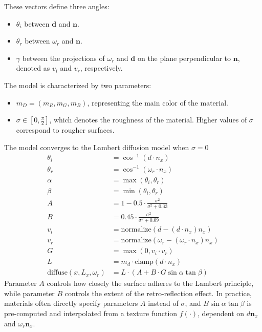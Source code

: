 These vectors define three angles:
\begin{itemize}
    \item $\theta_i$ between $\mathbf{d}$ and $\mathbf{n}$.
    \item $\theta_r$ between $\omega_r$ and $\mathbf{n}$.
    \item $\gamma$ between the projections of $\omega_r$ and $\mathbf{d}$ on the plane perpendicular to $\mathbf{n}$, denoted as $v_i$ and $v_r$, respectively.
\end{itemize}
The model is characterized by two parameters:
\begin{itemize}
    \item $m_D = (m_R, m_G, m_B)$, representing the main color of the material. 
    \item $\sigma\in\left[0,\frac{\pi}{2}\right]$, which denotes the roughness of the material. 
        Higher values of $\sigma$ correspond to rougher surfaces.
\end{itemize}
The model converges to the Lambert diffusion model when $\sigma = 0$
\begin{align*}
    \theta_i &= \cos^{-1}(d \cdot n_x) \\
    \theta_r &= \cos^{-1}(\omega_r \cdot n_x) \\
    \alpha &= \max(\theta_i, \theta_r) \\
    \beta &= \min(\theta_i, \theta_r) \\
    A &= 1 - 0.5 \cdot \frac{\sigma^2}{\sigma^2 + 0.33} \\
    B &= 0.45 \cdot \frac{\sigma^2}{\sigma^2 + 0.09} \\
    v_i &= \text{normalize}(d - (d \cdot n_x)n_x) \\
    v_r &= \text{normalize}(\omega_r - (\omega_r \cdot n_x)n_x) \\
    G &= \max(0, v_i \cdot v_r) \\
    L &= m_d \cdot \text{clamp}(d \cdot n_x) \\
    \text{diffuse}(x, L_x, \omega_r) &= L \cdot (A + B \cdot G \sin\alpha \tan\beta)
\end{align*}
Parameter $A$ controls how closely the surface adheres to the Lambert principle, while parameter $B$ controls the extent of the retro-reflection effect.
In practice, materials often directly specify parameters $A$ instead of $\sigma$, and $B\sin \alpha\tan \beta$ is pre-computed and interpolated from a texture function $f(\cdot)$, dependent on $d\mathbf{n}_x$ and $\omega_r\mathbf{n}_x$.